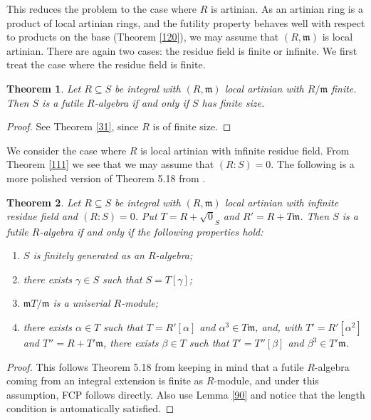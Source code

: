 \documentclass{amsart}
\theoremstyle{plain}
\newtheorem{theorem}{Theorem}[section]
\theoremstyle{definition}
\begin{document}
This reduces the problem to the case where $R$ is artinian. As an artinian ring is a product of local artinian rings, and the futility property
behaves well with respect to products on the base (Theorem \ref{120}), we may assume that $(R,{\mathfrak{m}})$ is local artinian. There are again two cases: the
residue field is finite or infinite. We first treat the case where the residue field is finite.

\begin{theorem}
 Let $R \subseteq S$ be integral with $(R,{\mathfrak{m}})$ local artinian with $R/{\mathfrak{m}}$ finite. Then $S$ is a futile $R$-algebra if and only if $S$ has finite
size.
\end{theorem}
\begin{proof}
See Theorem \ref{31}, since $R$ is of finite size. 
\end{proof}

We consider the case where $R$ is local artinian with infinite residue field. From Theorem \ref{111} we see that we may assume that $(R:S)=0$. The
following is a more polished version of Theorem 5.18 from \cite{DO5}. 

\begin{theorem} \label{112}
 Let $R \subseteq S$ be integral with $(R,{\mathfrak{m}})$ local artinian with infinite residue field and $(R:S)=0$. 
Put $T=R+\sqrt{0}_S$ and $R'=R+T{\mathfrak{m}}$. 
Then $S$ is a futile $R$-algebra if and only if the following
properties hold:
\begin{enumerate}
 \item $S$ is finitely generated as an $R$-algebra;
 \item there exists $\gamma \in S$ such that $S=T[\gamma]$;
 \item ${\mathfrak{m}} T/{\mathfrak{m}}$ is a uniserial $R$-module;
 \item there exists $\alpha \in T$ such that $T=R'[\alpha]$ and $\alpha^3 \in T{\mathfrak{m}}$, and, with $T'=R'[\alpha^2]$ and $T''=R+T'{\mathfrak{m}}$, there exists
$\beta \in T$ such that $T'=T''[\beta]$ and $\beta^3 \in T'{\mathfrak{m}}$. 
\end{enumerate}
\end{theorem}
\begin{proof}
This follows Theorem 5.18 from \cite{DO5} keeping in mind that a futile $R$-algebra coming from an integral extension is finite as $R$-module, and
under this assumption, FCP follows directly. Also use Lemma \ref{90} and notice that the length condition is automatically satisfied. 
\end{proof}
\end{document}
